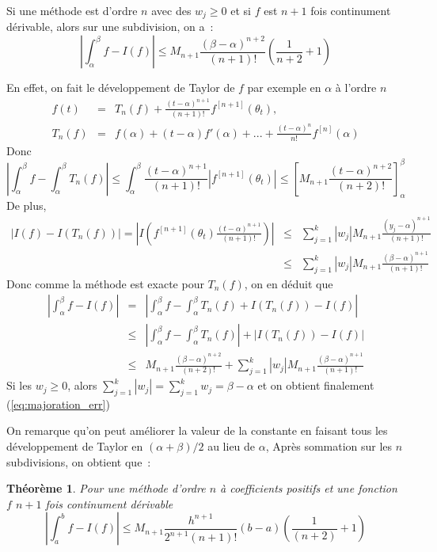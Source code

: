 \documentclass[a4paper,11pt]{article}
\newtheorem{thm}{Théorème}
\begin{document}
Si une méthode est d'ordre $n$ avec des $w_j\geq 0$ et 
si $f$ est $n+1$ fois continument dérivable,
alors sur une subdivision, on a~:
\begin{equation} \label{eq:majoration_err}
|\int_{\alpha}^{\beta} f-I(f)| \leq M_{n+1} \frac{(\beta-\alpha)^{n+2}}{(n+1)!}
(\frac{1}{n+2}+1)
\end{equation}

En effet, on fait le développement de Taylor de $f$ par exemple
en $\alpha$ à l'ordre $n$
\begin{eqnarray*}
 f(t)&=&T_{n}(f)+\frac{(t-\alpha)^{n+1}}{(n+1)!} f^{[n+1]}(\theta_t),\\
 T_{n}(f)&=&f(\alpha)+(t-\alpha)f'(\alpha)+...+ 
\frac{(t-\alpha)^{n}}{n!} f^{[n]}(\alpha)
\end{eqnarray*}
Donc 
\[ |\int_{\alpha}^{\beta} f- \int_{\alpha}^{\beta} T_{n}(f)|
\leq \int_{\alpha}^{\beta} \frac{(t-\alpha)^{n+1}}{(n+1)!} |f^{[n+1]}(\theta_t)| 
\leq \left[ M_{n+1} \frac{(t-\alpha)^{n+2}}{(n+2)!} \right]_\alpha^\beta
\]
De plus, 
\begin{eqnarray*}
 |I(f) -I(T_n(f))| =|I\left( f^{[n+1]}(\theta_t)
  \frac{(t-\alpha)^{n+1}}{(n+1)!} \right)|
& \leq &  \sum_{j=1}^k |w_j| M_{n+1} \frac{(y_j-\alpha)^{n+1}}{(n+1)!} 
\\
& \leq & \sum_{j=1}^k |w_j| M_{n+1} \frac{(\beta-\alpha)^{n+1}}{(n+1)!}
\end{eqnarray*}
Donc comme la méthode est exacte pour $T_n(f)$, on en déduit que
\begin{eqnarray*}
|\int_{\alpha}^{\beta} f-I(f)|
&= &|\int_{\alpha}^{\beta} f-\int_{\alpha}^{\beta} T_n(f)+I(T_n(f))- I(f)| \\
&\leq& |\int_{\alpha}^{\beta} f-\int_{\alpha}^{\beta} T_n(f)|+|I(T_n(f))- I(f)|\\
&\leq & M_{n+1}  \frac{(\beta-\alpha)^{n+2}}{(n+2)!} +  
\sum_{j=1}^k |w_j| M_{n+1} \frac{(\beta-\alpha)^{n+1}}{(n+1)!} 
\end{eqnarray*}
Si les $w_j\geq 0$, alors $\sum_{j=1}^k |w_j|=\sum_{j=1}^k w_j=\beta-\alpha$
et on obtient finalement (\ref{eq:majoration_err})

On remarque qu'on peut am\'eliorer la valeur de la constante 
en faisant tous les d\'eveloppement de Taylor
en $(\alpha+\beta)/2$ au lieu de $\alpha$, 
Après sommation sur les $n$ subdivisions, on obtient que~:
\begin{thm}
Pour une méthode d'ordre $n$ à coefficients positifs et une fonction $f$
$n+1$ fois continument d\'erivable~
\[|\int_{a}^{b} f-I(f)| \leq M_{n+1} \frac{h^{n+1}}{2^{n+1}(n+1)!}  (b-a) 
(\frac{1}{(n+2)}+1)\]
\end{thm}
\end{document}
